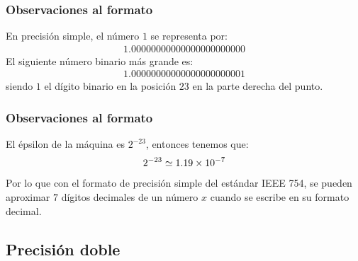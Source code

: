 \documentclass[12pt]{beamer}
\begin{document}
\begin{frame}
\frametitle{Observaciones al formato}
En precisión simple, el número $1$ se representa por:
\pause
\begin{align*}
1.00000000000000000000000
\end{align*}
\pause
El siguiente número binario más grande es:
\pause
\begin{align*}
1.00000000000000000000001
\end{align*}
siendo $1$ el dígito binario en la posición $23$ en la parte derecha del punto.
\end{frame}
\begin{frame}
\frametitle{Observaciones al formato}
El épsilon de la máquina es $2^{-23}$, entonces tenemos que:
\pause
\begin{align*}
2^{-23} \simeq \num{1.19d-7}
\end{align*}
\pause
Por lo que con el formato de precisión simple del estándar IEEE 754, se pueden aproximar $7$ dígitos decimales de un número $x$ cuando se escribe en su formato decimal.
\end{frame}

\subsection{Precisión doble}
\end{document}
